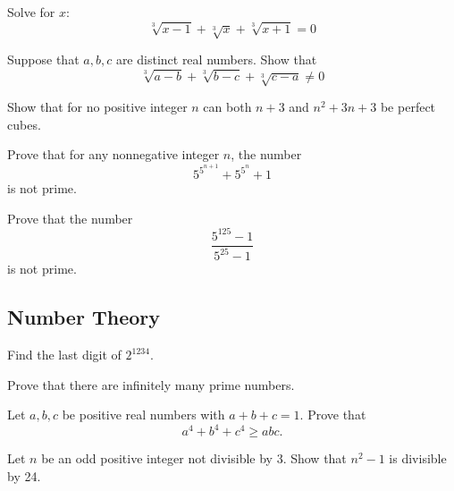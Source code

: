 \documentclass[12pt]{article}
\begin{document}
            \begin{exercise}
            Solve for $x$:
            \[\sqrt[3]{x-1} + \sqrt[3]{x}  + \sqrt[3]{x+1} = 0\]
        \end{exercise}
            
        \begin{exercise}
            Suppose that $a,b,c$ are distinct real numbers. Show that 
            \begin{equation*}
                \sqrt[3]{a - b} + \sqrt[3]{b - c}  + \sqrt[3]{c - a} \neq 0
            \end{equation*}
        \end{exercise}
            
        \begin{exercise}
            Show that for no positive integer $n$ can both $n+3$ and $n^2+3n+3$ be perfect cubes.
        \end{exercise}
            
        \begin{exercise}
            Prove that for any nonnegative integer $n$, the number
            \[5^{5^{n+1}}+5^{5^n} +1\] is not prime.
        \end{exercise}
            
        \begin{exercise}
            Prove that the number
            \[\frac{5^{125}-1}{5^{25}-1}\]
            is not prime.
        \end{exercise}

    \subsection{Number Theory}

        \begin{exercise}
            Find the last digit of \(2^{1234}\).
        \end{exercise}

        \begin{exercise}
            Prove that there are infinitely  many prime numbers.
        \end{exercise}

        \begin{exercise}
            Let \(a,b,c\) be positive real numbers with \(a+b+c=1\). Prove that
            \[a^4 + b^4 + c^4 \geq abc.\]
        \end{exercise}
    
        \begin{exercise}
            Let \(n\) be an odd positive integer not divisible by 3. Show that \(n^2-1\) is divisible by 24.
        \end{exercise}
    
\end{document}

